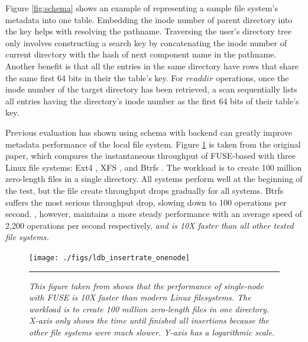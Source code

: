 Figure \ref{fig:schema} shows an example of representing
a sample file system's metadata into one table.
Embedding the inode number of parent directory into the key
helps with resolving the pathname.
Traversing the user's directory tree
only involves constructing a search key by concatenating the inode
number of current directory with the hash of
next component name in the pathname.
Another benefit is that all the entries in the same directory have rows that
share the same first 64 bits in their the table's key.
For $readdir$ operations, once the inode number
of the target directory has been retrieved,
a scan sequentially lists all entries having
the directory's inode number as the first 64 bits of their table's key.

Previous evaluation \cite{TableFS} has shown using \tfs schema with \ldb backend
can greatly improve metadata performance of the local file system.
Figure \ref{graph:ldb-singlenode} is taken from the original \tfs paper,
which compares the instantaneous throughput of FUSE-based \tfs
with three Linux file systems: Ext4 \cite{Ext4}, XFS \cite{XFS}, and
Btrfs \cite{BTRFS}.
The workload is to create 100 million zero-length files in a single directory.
All systems perform well at the beginning of the test, but the file create
throughput drops gradually for all systems.
Btrfs suffers the most serious throughput drop, slowing down to 100 operations
per second.
\tfs, however, maintains a more steady performance
with an average speed of 2,200 operations per second respectively,
\textit{and is 10X faster than all other tested file systems.}

\begin{figure}[t]  %
\centerline{\texttt{[image: ./figs/ldb\_insertrate\_onenode]}}
\vspace{10pt}
\caption{\normalsize
\textit{This figure taken from \cite{TableFS} shows
that the performance of single-node \tfs with FUSE is 10X faster than modern Linux
filesystems. The workload is to create 100 million zero-length files in one directory.
X-axis only shows the time until \tfs finished all insertions because the other
file systems were much slower. Y-axis has a logarithmic scale.}
}
\vspace{10pt}
\hrule 
\label{graph:ldb-singlenode}
\end{figure}       %
